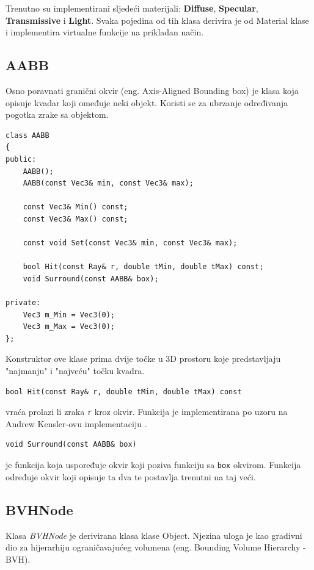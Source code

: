 \documentclass[
12pt, %
oneside, %
english, %
singlespacing, %
parskip, %
headsepline, %
chapterinoneline, %
consistentlayout, %
]{MastersDoctoralThesis} %
\begin{document}
\vspace*{1cm}
Trenutno su implementirani sljedeći materijali: \textbf{Diffuse}, \textbf{Specular},
\textbf{Transmissive} i \textbf{Light}. Svaka pojedina od tih klasa derivira je od Material 
klase i implementira virtualne funkcije na prikladan način.

\vspace*{2cm}

\subsection*{AABB}

Osno poravnati granični okvir (eng. Axis-Aligned Bounding box) je klasa koja opisuje kvadar
koji omeđuje neki objekt. Koristi se za ubrzanje određivanja pogotka zrake sa objektom.

\begin{verbatim}
class AABB
{
public:
	AABB();
	AABB(const Vec3& min, const Vec3& max);

	const Vec3& Min() const;
	const Vec3& Max() const;

	const void Set(const Vec3& min, const Vec3& max);

	bool Hit(const Ray& r, double tMin, double tMax) const;
	void Surround(const AABB& box);

private:
	Vec3 m_Min = Vec3(0);
	Vec3 m_Max = Vec3(0);
};
\end{verbatim}

Konstruktor ove klase prima dvije točke u 3D prostoru koje predstavljaju "najmanju" i "najveću"
točku kvadra.

\begin{verbatim}
bool Hit(const Ray& r, double tMin, double tMax) const
\end{verbatim}
vraća prolazi li zraka \texttt{r} kroz okvir. Funkcija je implementirana po uzoru na Andrew
Kensler-ovu implementaciju \cite{kensler}.

\begin{minipage}{\textwidth}
\begin{verbatim}
void Surround(const AABB& box)
\end{verbatim}
je funkcija koja uspoređuje okvir koji poziva funkciju sa \texttt{box} okvirom. Funkcija određuje
okvir koji opisuje ta dva te postavlja trenutni na taj veći.
\end{minipage}

\subsection*{BVHNode}
Klasa \emph{BVHNode} je derivirana klasa klase Object. Njezina uloga je kao gradivni dio za
hijerarhiju ograničavajućeg volumena (eng. Bounding Volume Hierarchy - BVH).
\end{document}
